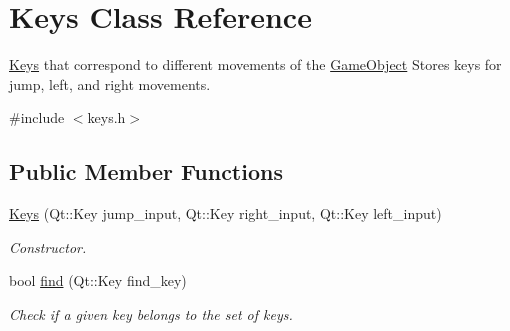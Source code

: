 \hypertarget{classKeys}{\section{Keys Class Reference}
\label{classKeys}
}


\hyperlink{classKeys}{Keys} that correspond to different movements of the \hyperlink{classGameObject}{Game\-Object} Stores keys for jump, left, and right movements.  




{\ttfamily \#include $<$keys.\-h$>$}

\subsection*{Public Member Functions}
\begin{DoxyCompactItemize}
\item 
\hyperlink{classKeys_a3de538e20099b64d2a99525406564337}{Keys} (Qt\-::\-Key jump\-\_\-input, Qt\-::\-Key right\-\_\-input, Qt\-::\-Key left\-\_\-input)
\begin{DoxyCompactList}\small\item\em Constructor. \end{DoxyCompactList}\item 
bool \hyperlink{classKeys_a993f866650aa42565a5e866459368fb0}{find} (Qt\-::\-Key find\-\_\-key)
\begin{DoxyCompactList}\small\item\em Check if a given key belongs to the set of keys. \end{DoxyCompactList}\end{DoxyCompactItemize}
